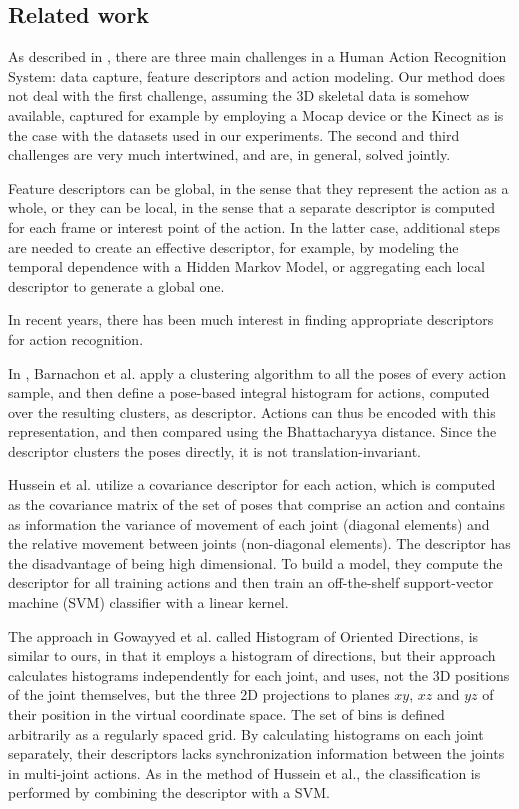 \documentclass{fcs}
\begin{document}
\subsection{Related work}
\label{related}

As described in \cite{hussein2013human}, there are three main challenges in a Human Action Recognition System: data capture, feature descriptors and action modeling. Our method does not deal with the first challenge, assuming the 3D skeletal data is somehow available, captured for example by employing a Mocap device or the Kinect as is the case with the datasets used in our experiments. The second and third challenges are very much intertwined, and are, in general, solved jointly.

Feature descriptors can be global, in the sense that they represent the action as a whole, or they can be local, in the sense that a separate descriptor is computed for each frame or interest point of the action. In the latter case, additional steps are needed to create an effective descriptor, for example, by modeling the temporal dependence with a Hidden Markov Model, or aggregating each local descriptor to generate a global one.

In recent years, there has been much interest in finding appropriate descriptors for action recognition.  

In \cite{barnachon2014ongoing}, Barnachon et al. apply a clustering algorithm to all the poses of every action sample, and then define a pose-based integral histogram for actions, computed over the resulting clusters, as descriptor. Actions can thus be encoded with this representation, and then compared using the Bhattacharyya distance. Since the descriptor clusters the poses directly, it is not translation-invariant.

Hussein et al. \cite{hussein2013human} utilize a covariance descriptor for each action, which is computed as the covariance matrix of the set of poses that comprise an action and contains as information the variance of movement of each joint (diagonal elements) and the relative movement between joints (non-diagonal elements). The descriptor has the disadvantage of being high dimensional. To build a model, they compute the descriptor for all training actions and then train an off-the-shelf  support-vector machine (SVM) classifier with a linear kernel. 

The approach in Gowayyed et al. \cite{gowayyed2013histogram} called Histogram of Oriented Directions, is similar to ours, in that it employs a histogram of directions, but their approach calculates histograms independently for each joint, and uses, not the 3D positions of the joint themselves, but the three 2D projections to planes $xy$, $xz$ and $yz$ of their position in the virtual coordinate space. The set of bins is defined arbitrarily as a regularly spaced grid. By calculating histograms on each joint separately, their descriptors lacks synchronization information between the joints in multi-joint actions. As in the method of Hussein et al., the classification is performed by combining the descriptor with a SVM.
\end{document}

